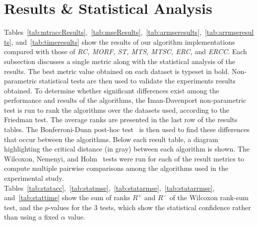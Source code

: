 \documentclass[reqno]{vcuthesis}
\numberwithin{equation}{chapter}
\begin{document}
\section{Results \& Statistical Analysis}\label{sec:MTRresults}
Tables~{\ref{tab:mtraccResults}},~{\ref{tab:mseResults}},~{\ref{tab:armseresults}},~{\ref{tab:arrmseresults}}, and~{\ref{tab:timeresults}} show the results of our algorithm implementations compared with those of \textit{RC, MORF, ST, MTS, MTSC, ERC,} and \textit{ERCC}. Each subsection discusses a single metric along with the statistical analysis of the results. The best metric value obtained on each dataset is typeset in bold. Non-parametric statistical tests are then used to validate the experiments results obtained. To determine whether significant differences exist among the performance and results of the algorithms, the Iman-Davenport non-parametric test is run to rank the algorithms over the datasets used, according to the Friedman test. The average ranks are presented in the last row of the results tables. The Bonferroni-Dunn post-hoc test~{\cite{Dunn1961}} is then used to find these differences that occur between the algorithms. Below each result table, a diagram highlighting the critical distance (in gray) between each algorithm is shown. The Wilcoxon, Nemenyi, and Holm~{\cite{Wilcoxon1945}} tests were run for each of the result metrics to compute multiple pairwise comparisons among the algorithms used in the experimental study. Tables~{\ref{tab:statacc}},~{\ref{tab:statmse}},~{\ref{tab:statarmse}},~{\ref{tab:statarrmse}}, and~{\ref{tab:stattime}} show the sum of ranks $R^+$ and $R^-$ of the Wilcoxon rank-sum test, and the $p$-values for the $3$ tests, which show the statistical confidence rather than using a fixed $\alpha$ value.
\end{document}
